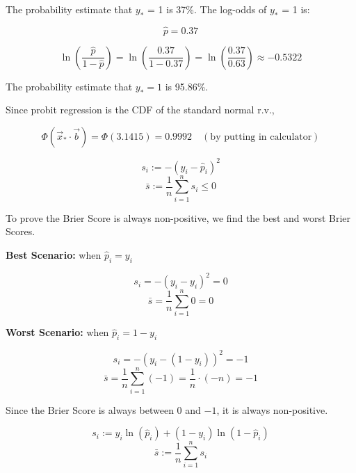 \documentclass[12pt]{article}
\begin{document}
\begin{enumerate}


The probability estimate that $y_*$ = 1 is 37\%.
The log-odds of $y_*$ = 1 is:

\[
\hat{p} = 0.37
\]

\[
\ln\left( \frac{\hat{p}}{1 - \hat{p}} \right) = \ln\left( \frac{0.37}{1 - 0.37} \right) = \ln\left( \frac{0.37}{0.63} \right) \approx -0.5322
\]


The probability estimate that $y_* = 1$ is 95.86\%.


Since probit regression is the CDF of the standard normal r.v.,

\[
\Phi(\vec{x}_* \cdot \vec{b}) = \Phi(3.1415) = 0.9992 \quad (\text{by putting in calculator})
\]


\[
s_i := -( y_i - \hat{p}_i )^2
\]
\[
\bar{s} := \frac{1}{n} \sum_{i=1}^n s_i \leq 0
\]

To prove the Brier Score is always non-positive, we find the best and worst Brier Scores.

\textbf{Best Scenario:} when \( \hat{p}_i = y_i \)

\[
s_i = -(y_i - y_i)^2 = 0
\]
\[
\bar{s} = \frac{1}{n} \sum_{i=1}^n 0 = 0
\]

\textbf{Worst Scenario:} when \( \hat{p}_i = 1 - y_i \)

\[
s_i = -(y_i - (1 - y_i))^2  = -1
\]
\[
\bar{s} = \frac{1}{n} \sum_{i=1}^n (-1) = \frac{1}{n} \cdot (-n) = -1
\]

Since the Brier Score is always between \(0\) and \(-1\), it is always non-positive.


\[
s_i := y_i \ln(\hat{p}_i) + (1 - y_i) \ln(1 - \hat{p}_i)
\]
\[
\bar{s} := \frac{1}{n} \sum_{i=1}^n s_i
\]


\end{enumerate}
\end{document}
